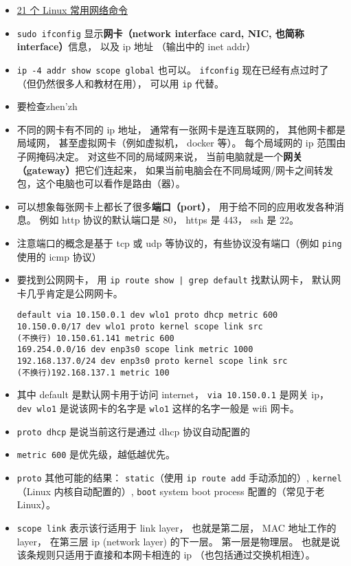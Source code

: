 
\begin{itemize}
\item \href{https://itsfoss.com/basic-linux-networking-commands/}{21 个 Linux 常用网络命令}
\item \verb`sudo ifconfig` 显示\textbf{网卡（network interface card, NIC, 也简称 interface）}信息， 以及 ip 地址 （输出中的 inet addr）
\item \verb`ip -4 addr show scope global` 也可以。 \verb`ifconfig` 现在已经有点过时了（但仍然很多人和教材在用）， 可以用 \verb`ip` 代替。
\item 要检查zhen'zh
\item 不同的网卡有不同的 ip 地址， 通常有一张网卡是连互联网的， 其他网卡都是局域网， 甚至虚拟网卡（例如虚拟机， docker 等）。 每个局域网的 ip 范围由子网掩码决定。 对这些不同的局域网来说， 当前电脑就是一个\textbf{网关（gateway）}把它们连起来， 如果当前电脑会在不同局域网/网卡之间转发包，这个电脑也可以看作是路由（器）。
\item 可以想象每张网卡上都长了很多\textbf{端口（port）}， 用于给不同的应用收发各种消息。 例如 http 协议的默认端口是 80， https 是 443， ssh 是 22。
\item 注意端口的概念是基于 tcp 或 udp 等协议的，有些协议没有端口（例如 \verb`ping` 使用的 icmp 协议）
\item 要找到公网网卡， 用 \verb`ip route show | grep default` 找默认网卡， 默认网卡几乎肯定是公网网卡。
\begin{lstlisting}[language=none]
default via 10.150.0.1 dev wlo1 proto dhcp metric 600
10.150.0.0/17 dev wlo1 proto kernel scope link src
(不换行) 10.150.61.141 metric 600
169.254.0.0/16 dev enp3s0 scope link metric 1000
192.168.137.0/24 dev enp3s0 proto kernel scope link src
(不换行)192.168.137.1 metric 100
\end{lstlisting}
\item 其中 default 是默认网卡用于访问 internet， \verb`via 10.150.0.1` 是网关 ip， \verb`dev wlo1` 是说该网卡的名字是 \verb`wlo1` 这样的名字一般是 wifi 网卡。
\item \verb`proto dhcp` 是说当前这行是通过 dhcp 协议自动配置的
\item \verb`metric 600` 是优先级，越低越优先。
\item \verb`proto` 其他可能的结果： \verb`static`（使用 \verb`ip route add` 手动添加的）, \verb`kernel`（Linux 内核自动配置的）, \verb`boot` system boot process 配置的（常见于老 Linux）。
\item \verb`scope link` 表示该行适用于 link layer， 也就是第二层， MAC 地址工作的 layer， 在第三层 ip (network layer) 的下一层。 第一层是物理层。 也就是说该条规则只适用于直接和本网卡相连的 ip （也包括通过交换机相连）。

\end{itemize}
